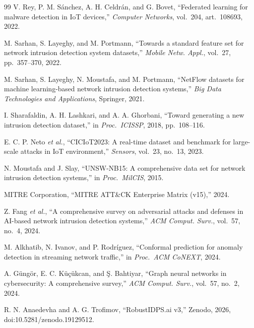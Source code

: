 \documentclass[11pt,a4paper]{article}
\begin{document}
\begin{thebibliography}{99}
V. Rey, P. M. S\'{a}nchez, A. H. Celdr\'{a}n, and G. Bovet, ``Federated learning for malware detection in IoT devices,'' \emph{Computer Networks}, vol.~204, art.~108693, 2022.

M. Sarhan, S. Layeghy, and M. Portmann, ``Towards a standard feature set for network intrusion detection system datasets,'' \emph{Mobile Netw. Appl.}, vol.~27, pp.~357--370, 2022.

M. Sarhan, S. Layeghy, N. Moustafa, and M. Portmann, ``NetFlow datasets for machine learning-based network intrusion detection systems,'' \emph{Big Data Technologies and Applications}, Springer, 2021.

I. Sharafaldin, A. H. Lashkari, and A. A. Ghorbani, ``Toward generating a new intrusion detection dataset,'' in \emph{Proc.\ ICISSP}, 2018, pp.~108--116.

E. C. P. Neto \emph{et al.}, ``CICIoT2023: A real-time dataset and benchmark for large-scale attacks in IoT environment,'' \emph{Sensors}, vol.~23, no.~13, 2023.

N. Moustafa and J. Slay, ``UNSW-NB15: A comprehensive data set for network intrusion detection systems,'' in \emph{Proc.\ MilCIS}, 2015.

MITRE Corporation, ``MITRE ATT\&CK Enterprise Matrix (v15),'' 2024.

Z. Fang \emph{et al.}, ``A comprehensive survey on adversarial attacks and defenses in AI-based network intrusion detection systems,'' \emph{ACM Comput. Surv.}, vol.~57, no.~4, 2024.

M. Alkhatib, N. Ivanov, and P. Rodr\'{i}guez, ``Conformal prediction for anomaly detection in streaming network traffic,'' in \emph{Proc.\ ACM CoNEXT}, 2024.

A. G\"{u}ng\"{o}r, E. C. K\"{u}\c{c}\"{u}kcan, and \c{S}. Bahtiyar, ``Graph neural networks in cybersecurity: A comprehensive survey,'' \emph{ACM Comput. Surv.}, vol.~57, no.~2, 2024.

R. N. Anaedevha and A. G. Trofimov, ``RobustIDPS.ai v3,'' Zenodo, 2026, doi:10.5281/zenodo.19129512.

\end{thebibliography}
\end{document}
